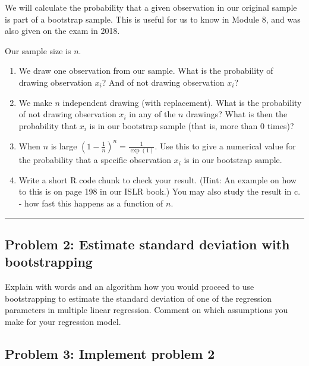 \documentclass[]{article}
\providecommand{\tightlist}{%
  \setlength{\itemsep}{0pt}\setlength{\parskip}{0pt}}
\begin{document}
We will calculate the probability that a given observation in our
original sample is part of a bootstrap sample. This is useful for us to
know in Module 8, and was also given on the exam in 2018.

Our sample size is \(n\).

\begin{enumerate}
\def\labelenumi{\alph{enumi}.}
\tightlist
\item
  We draw one observation from our sample. What is the probability of
  drawing observation \(x_i\)? And of not drawing observation \(x_i\)?
\item
  We make \(n\) independent drawing (with replacement). What is the
  probability of not drawing observation \(x_i\) in any of the \(n\)
  drawings? What is then the probability that \(x_i\) is in our
  bootstrap sample (that is, more than 0 times)?
\item
  When \(n\) is large \((1-\frac{1}{n})^n=\frac{1}{\exp(1)}\). Use this
  to give a numerical value for the probability that a specific
  observation \(x_i\) is in our bootstrap sample.
\item
  Write a short R code chunk to check your result. (Hint: An example on
  how to this is on page 198 in our ISLR book.) You may also study the
  result in c. - how fast this happens as a function of \(n\).
\end{enumerate}

\begin{center}\rule{0.5\linewidth}{\linethickness}\end{center}

\hypertarget{problem-2-estimate-standard-deviation-with-bootstrapping}{%
\subsection{Problem 2: Estimate standard deviation with
bootstrapping}\label{problem-2-estimate-standard-deviation-with-bootstrapping}}

Explain with words and an algorithm how you would proceed to use
bootstrapping to estimate the standard deviation of one of the
regression parameters in multiple linear regression. Comment on which
assumptions you make for your regression model.

\hypertarget{problem-3-implement-problem-2}{%
\subsection{Problem 3: Implement problem
2}\label{problem-3-implement-problem-2}}
\end{document}
